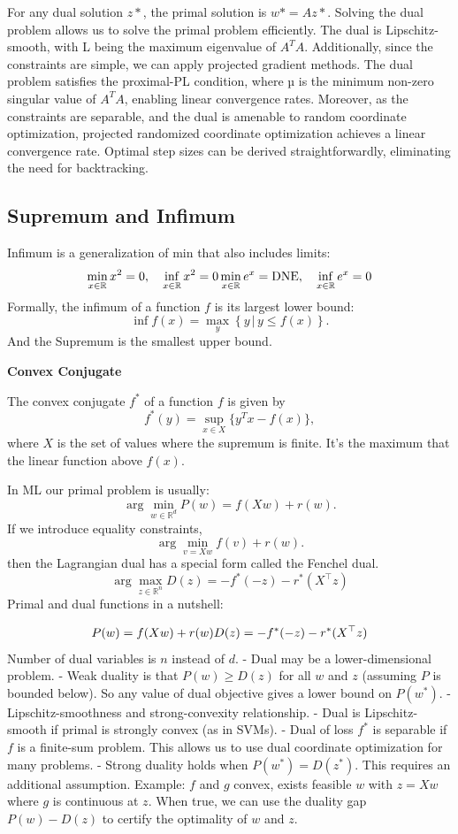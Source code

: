 \documentclass[
]{article}
\begin{document}
For any dual solution \(z*\), the primal solution is \(w* = Az*\). Solving the dual problem allows us to solve the primal problem efficiently. The dual is Lipschitz-smooth, with L being the maximum eigenvalue of \(A^TA\). Additionally, since the constraints are simple, we can apply projected gradient methods. The dual problem satisfies the proximal-PL condition, where µ is the minimum non-zero singular value of \(A^TA\), enabling linear convergence rates. Moreover, as the constraints are separable, and the dual is amenable to random coordinate optimization, projected randomized coordinate optimization achieves a linear convergence rate. Optimal step sizes can be derived straightforwardly, eliminating the need for backtracking.

\subsection{Supremum and Infimum}\label{supremum-and-infimum}

Infimum is a generalization of min that also includes limits:
\[
\min_{x \in \mathbb{R}} x^2 = 0, \quad \inf_{x \in \mathbb{R}} x^2 = 0\\
\min_{x \in \mathbb{R}} e^x = \text{DNE}, \quad \inf_{x \in \mathbb{R}} e^x = 0
\]
Formally, the infimum of a function \(f\) is its largest lower bound:
\[
\inf f(x) = \max_{y} \left\{ y \,|\, y \leq f(x) \right\}.
\]
And the Supremum is the smallest upper bound.

\textbf{Convex Conjugate}

The convex conjugate \(f^*\) of a function \(f\) is given by
\[
f^*(y) = \sup_{x \in X} \{ y^Tx - f(x) \},
\]
where \(X\) is the set of values where the supremum is finite. It's the maximum that the linear function above \(f(x)\).

In ML our primal problem is usually:
\[
\arg\min_{w \in \mathbb{R}^d} P(w) = f(Xw) + r(w).
\]
If we introduce equality constraints,
\[
\arg\min_{v=Xw} f(v) + r(w).
\]
then the Lagrangian dual has a special form called the Fenchel dual.
\[
\arg\max_{z \in \mathbb{R}^n} D(z) = -f^*(-z) - r^*(X^\top z)
\]
Primal and dual functions in a nutshell:

\[
P(w) = f(Xw) + r(w) \\
D(z) = -f^*(-z) - r^*(X^\top z)
\]
Number of dual variables is \(n\) instead of \(d\).
- Dual may be a lower-dimensional problem.
- Weak duality is that \(P(w) \geq D(z)\) for all \(w\) and \(z\) (assuming \(P\) is bounded below). So any value of dual objective gives a lower bound on \(P(w^*)\).
- Lipschitz-smoothness and strong-convexity relationship.
- Dual is Lipschitz-smooth if primal is strongly convex (as in SVMs).
- Dual of loss \(f^*\) is separable if \(f\) is a finite-sum problem. This allows us to use dual coordinate optimization for many problems.
- Strong duality holds when \(P(w^*) = D(z^*)\). This requires an additional assumption.
Example: \(f\) and \(g\) convex, exists feasible \(w\) with \(z = Xw\) where \(g\) is continuous at \(z\). When true, we can use the duality gap \(P(w) - D(z)\) to certify the optimality of \(w\) and \(z\).
\end{document}
